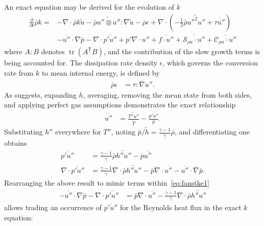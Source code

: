 \documentclass[letterpaper,11pt,nointlimits,reqno,draft]{amsbook}
\newcommand{\trans}[1]{{#1}^{\ensuremath{\mathsf{T}}}}
\DeclareMathOperator{\trace}{tr}
\newcommand{\Ssd}{\ensuremath{\mathcal{S}}} %
\newcommand{\Cs}{\ensuremath{\mathcal{C}}}  %
\begin{document}
An exact equation may be derived for the evolution of $k$
\citep[\textsection{}5]{OliverFANSModels2011}
\begin{align}
\label{eq:fanstke1}
    \frac{\partial{}}{\partial{}t}\bar{\rho}k
 =
 &- \nabla\cdot\bar{\rho}k\tilde{u}
  - \bar{\rho} \widetilde{u''\otimes{}u''} : \nabla\tilde{u}
  - \bar{\rho} \epsilon
  + \nabla\cdot\left(
        -\frac{1}{2}\bar{\rho}\widetilde{{u''}^{2}u''}
      + \overline{\tau{}u''}
    \right)
\\
 &- \overline{u''}\cdot\nabla\bar{p}
  - \nabla\cdot\overline{p' u''}
  + \overline{p' \nabla\cdot{}u''}
  + \overline{f\cdot{}u''}
  + \overline{\Ssd_{\rho{} u}\cdot{}u''}
  + \overline{\Cs_{\rho{} u}\cdot{}u''}
\end{align}
where $A:B$ denotes $\trace \left(\trans{A} B\right)$, and the contribution of
the slow growth terms is being accounted for. The dissipation rate
density $\epsilon$, which governs the conversion rate from $k$ to mean internal
energy, is defined by
\begin{align}
  \bar{\rho} \epsilon &= \overline{\tau : \nabla{}u''}
.
\end{align}
As \citet[page 216]{Lele1994Compressibility} suggests, expanding $h$,
averaging, removing the mean state from both sides, and applying perfect gas
assumptions demonstrates the exact relationship
\begin{align}
  \overline{u''}
&=
  \frac{\widetilde{T''u''}}{\tilde{T}} - \frac{\overline{p'u''}}{\bar{p}}
.
\end{align}
Substituting $h''$ everywhere for $T''$, noting $\bar{p}/\tilde{h} =
\frac{\gamma-1}{\gamma}\bar{\rho}$, and differentiating one obtains
\begin{align}
  \overline{p'u''}
&=
  \frac{\gamma-1}{\gamma} \bar{\rho} \widetilde{h''u''}
- \bar{p} \overline{u''}
\\
  \nabla\cdot \overline{p'u''}
&=
  \frac{\gamma-1}{\gamma} \nabla\cdot \bar{\rho} \widetilde{h''u''}
- \bar{p}\nabla\cdot\overline{u''}
- \overline{u''}\cdot\nabla{}\bar{p}
.
\end{align}
Rearranging the above result to mimic terms within~\eqref{eq:fanstke1}
\begin{align}
  - \overline{u''}\cdot\nabla\bar{p}
  - \nabla\cdot\overline{p'u''}
&=
  \bar{p}\nabla\cdot\overline{u''}
- \frac{\gamma-1}{\gamma} \nabla\cdot \bar{\rho} \widetilde{h''u''}
\end{align}
allows trading an occurrence of $\overline{p'u''}$ for the Reynolds heat
flux in the exact $k$ equation:
\end{document}
